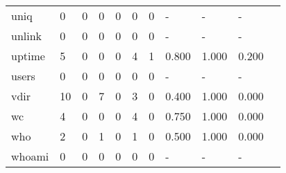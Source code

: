 \begin{longtable}{lp{1.10cm}p{1.10cm}p{1.10cm}p{1.10cm}p{1.10cm}p{1.10cm}p{1.10cm}p{1.10cm}p{1.10cm}p{1.10cm}}
uniq      &                      0 &                                  0 &                                 0 &                                0 &                                 0 &                               0 &                              - &                                     - &                                   - \\
unlink    &                      0 &                                  0 &                                 0 &                                0 &                                 0 &                               0 &                              - &                                     - &                                   - \\
uptime    &                      5 &                                  0 &                                 0 &                                0 &                                 4 &                               1 &                          0.800 &                                 1.000 &                               0.200 \\
users     &                      0 &                                  0 &                                 0 &                                0 &                                 0 &                               0 &                              - &                                     - &                                   - \\
vdir      &                     10 &                                  0 &                                 7 &                                0 &                                 3 &                               0 &                          0.400 &                                 1.000 &                               0.000 \\
wc        &                      4 &                                  0 &                                 0 &                                0 &                                 4 &                               0 &                          0.750 &                                 1.000 &                               0.000 \\
who       &                      2 &                                  0 &                                 1 &                                0 &                                 1 &                               0 &                          0.500 &                                 1.000 &                               0.000 \\
whoami    &                      0 &                                  0 &                                 0 &                                0 &                                 0 &                               0 &                              - &                                     - &                                   - \\

\end{longtable}
